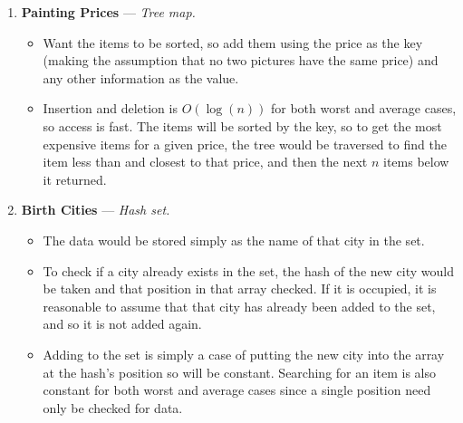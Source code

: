 \documentclass[11pt]{article} %
\begin{document}
\begin{enumerate}
	\item \textbf{Painting Prices} --- \textit{Tree map.}

		\begin{itemize}
			\item Want the items to be sorted, so add them using the price as
				the key (making the assumption that no two pictures have the
				same price) and any other information as the value.
			\item Insertion and deletion is $O(\log(n))$ for both worst and
				average cases, so access is fast. The items will be sorted by
				the key, so to get the most expensive items for a given price,
				the tree would be traversed to find the item less than and
				closest to that price, and then the next $n$ items below it
				returned.
		\end{itemize}

	\item \textbf{Birth Cities} --- \textit{Hash set.}

		\begin{itemize}
			\item The data would be stored simply as the name of that city in
				the set.
			\item To check if a city already exists in the set, the hash of the
				new city would be taken and that position in that array
				checked. If it is occupied, it is reasonable to assume that
				that city has already been added to the set, and so it is not
				added again.
			\item Adding to the set is simply a case of putting the new city
				into the array at the hash's position so will be constant.
				Searching for an item is also constant for both worst and
				average cases since a single position need only be checked for
				data.
		\end{itemize}

\end{enumerate}
\end{document}
